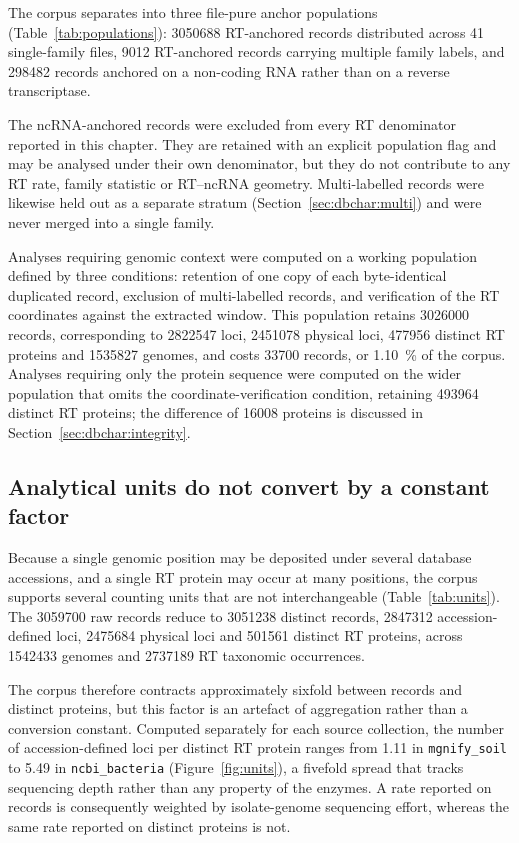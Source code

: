 The corpus separates into three file-pure anchor populations (Table~\ref{tab:populations}):
\num{3050688} RT-anchored records distributed across 41 single-family files, \num{9012} RT-anchored
records carrying multiple family labels, and \num{298482} records anchored on a non-coding RNA
rather than on a reverse transcriptase.

The ncRNA-anchored records were excluded from every RT denominator reported in this chapter. They
are retained with an explicit population flag and may be analysed under their own denominator, but
they do not contribute to any RT rate, family statistic or RT--ncRNA geometry. Multi-labelled
records were likewise held out as a separate stratum (Section~\ref{sec:dbchar:multi}) and were never
merged into a single family.

Analyses requiring genomic context were computed on a working population defined by three
conditions: retention of one copy of each byte-identical duplicated record, exclusion of
multi-labelled records, and verification of the RT coordinates against the extracted window. This
population retains \num{3026000} records, corresponding to \num{2822547} loci, \num{2451078}
physical loci, \num{477956} distinct RT proteins and \num{1535827} genomes, and costs \num{33700}
records, or \SI{1.10}{\percent} of the corpus. Analyses requiring only the protein sequence were
computed on the wider population that omits the coordinate-verification condition, retaining
\num{493964} distinct RT proteins; the difference of \num{16008} proteins is discussed in
Section~\ref{sec:dbchar:integrity}.

\subsection{Analytical units do not convert by a constant factor}
\label{sec:dbchar:units}

Because a single genomic position may be deposited under several database accessions, and a single
RT protein may occur at many positions, the corpus supports several counting units that are not
interchangeable (Table~\ref{tab:units}). The \num{3059700} raw records reduce to \num{3051238}
distinct records, \num{2847312} accession-defined loci, \num{2475684} physical loci and
\num{501561} distinct RT proteins, across \num{1542433} genomes and \num{2737189} RT taxonomic
occurrences.

The corpus therefore contracts approximately sixfold between records and distinct proteins, but this
factor is an artefact of aggregation rather than a conversion constant. Computed separately for each
source collection, the number of accession-defined loci per distinct RT protein ranges from 1.11 in
\texttt{mgnify\_soil} to 5.49 in \texttt{ncbi\_bacteria} (Figure~\ref{fig:units}), a fivefold spread
that tracks sequencing depth rather than any property of the enzymes. A rate reported on records is
consequently weighted by isolate-genome sequencing effort, whereas the same rate reported on
distinct proteins is not.

